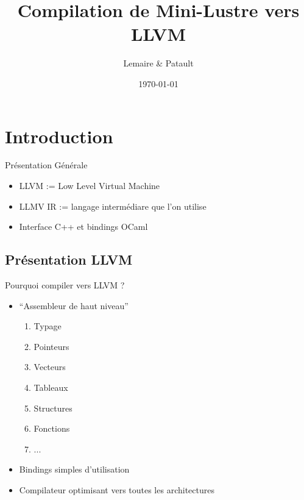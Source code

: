 \documentclass{beamer} %
\title[Mini-Lustre $\mapsto$ LLVM]{Compilation de Mini-Lustre vers LLVM}
\institute[UPSaclay]{Université Paris-Saclay}
\author{Lemaire \& Patault}
\date{\today}
\begin{document}

\begin{frame}
    \titlepage
\end{frame}

\section{Introduction}

\begin{frame}
    \tableofcontents[currentsection]
\end{frame}

\begin{frame}[fragile]{Présentation Générale}
            \vfill
    \begin{itemize}
        \item LLVM := Low Level Virtual Machine

        \vfill\item LLMV IR := langage intermédiare que l'on utilise

        \vfill\item Interface C++ et bindings OCaml
    \end{itemize}
            \vfill
\end{frame}

\subsection{Présentation LLVM}

\begin{frame}{Pourquoi compiler vers LLVM ?}
    \vfill
    \begin{itemize}
        \item “Assembleur de haut niveau”
        \begin{enumerate}
            \item Typage
            \item Pointeurs
            \item Vecteurs
            \item Tableaux
            \item Structures
            \item Fonctions
            \item ...
        \end{enumerate}
    \vfill \item Bindings simples d'utilisation
    \vfill \item Compilateur optimisant vers toutes les architectures
    \end{itemize}
    \vfill
\end{frame}
\end{document}
